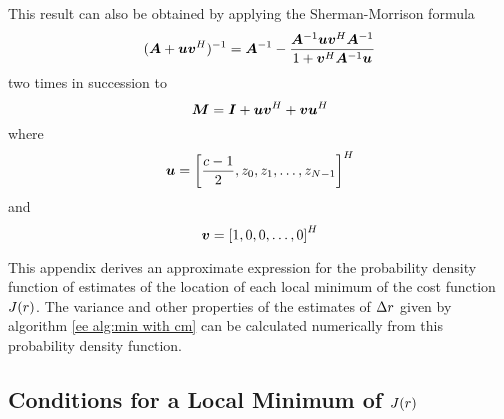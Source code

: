 This result can also be obtained by applying the Sherman-Morrison 
formula~\cite{Gol83}
\begin{equation}
(\bm{A}+\bm{u}\bm{v}^H)^{-1}=
\bm{A}^{-1}-\frac{\bm{A}^{-1}\bm{u}\bm{v}^H\bm{A}^{-1}}
{1+\bm{v}^H\bm{A}^{-1}\bm{u}}
\end{equation}
two times in succession to
\begin{equation}
\bm{M}=\bm{I}+\bm{u}\bm{v}^H+\bm{v}\bm{u}^H
\end{equation}
where
\begin{equation}
\bm{u}=\left[\frac{c-1}{2},z_0,z_1,\ldots,z_{N-1}\right]^H
\end{equation}
and 
\begin{equation}
\bm{v}=\left[1,0,0,\ldots,0\right]^H
\end{equation}

\label{sp app:phase est}

This appendix derives an approximate expression for the probability density 
function of estimates of the location of each local minimum of the cost
function $J({r})$.  The variance and other properties of the estimates of
${\Delta r}$ given by algorithm \ref{ee alg:min with cm} can be calculated
numerically from this probability density function.

\subsection{Conditions for a Local Minimum of $J({r})$}

